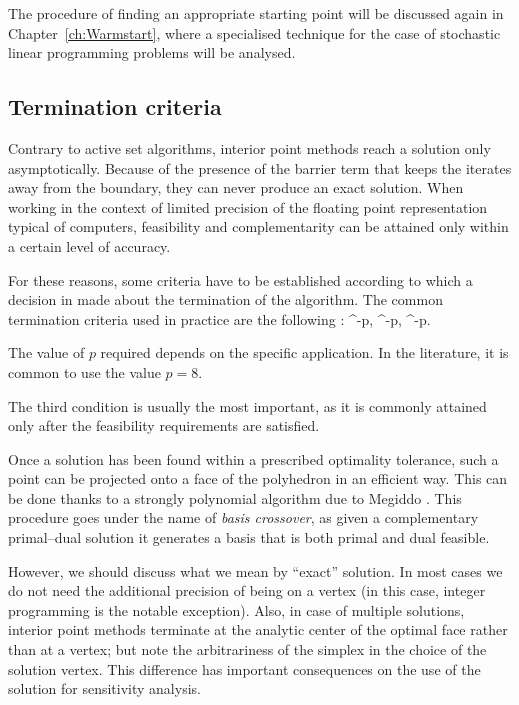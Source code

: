 The procedure of finding an appropriate starting point will be discussed
again in Chapter~\ref{ch:Warmstart}, where a specialised technique for
the case of stochastic linear programming problems will be analysed.

%
%
\subsection{Termination criteria}

Contrary to active set algorithms, interior point methods reach a
solution only asymptotically. 
Because of the presence of the barrier term that keeps the iterates
away from the boundary, they can never produce an exact solution.
When working in the context of limited precision of the
floating point representation typical of computers, feasibility and
complementarity can be attained only within a certain level
of accuracy.

For these reasons, some criteria have to be established according
to which a decision in made about the termination of the algorithm.
The common termination criteria used in practice are the
following \cite{GondzioTerlaky}:
\be  \label{eq:TerminationCriteria}
  ^{-p}, 
\qquad
{}  ^{-p},
\qquad
{}  ^{-p}.
\ee

The value of $p$ required depends on the specific application.
In the literature, it is common to use the value $p = 8$.

The third condition is usually the most important, as it is
commonly attained only after the feasibility requirements are satisfied.


Once a solution has been found within a prescribed 
optimality tolerance, such a point can be projected onto a face 
of the polyhedron in an efficient way.
This can be done thanks to a strongly polynomial algorithm due
to Megiddo \cite{Megiddo91}. This procedure goes under the name
of {\em basis crossover}, 
as given a complementary primal--dual solution it generates a basis 
that is both primal and dual feasible.

However, we should discuss what we mean by ``exact'' solution. In most
cases we do not need the additional precision of being on a vertex (in
this case, integer programming is the notable exception).
Also, in case of multiple solutions, interior point methods terminate
at the analytic center of the optimal face rather than at a vertex; 
but note the arbitrariness of the simplex in the choice of the solution
vertex.
This difference has important consequences on the use of the solution
for sensitivity analysis. 

